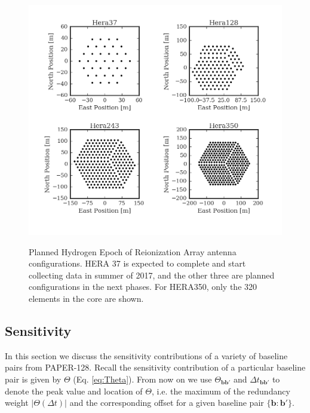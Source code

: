 \documentclass[twocolumn,apj,numberedappendix]{emulateapj}
\renewcommand\[{\begin{equation}}
\renewcommand\]{\end{equation}}
\begin{document}
\begin{figure}[h]
\includegraphics[width=\linewidth]{HeraAntpos}
\label{fig:HeraAntpos}
\caption{Planned Hydrogen Epoch of Reionization Array antenna configurations. HERA 37 is expected to complete and start collecting data in summer of 2017, and the other three are planned configurations in the next phases. For HERA350, only the 320 elements in the core are shown. }
\end{figure}

\subsection{ Sensitivity \label{sec:sensitivity}}
In this section we discuss the sensitivity contributions of a variety of baseline pairs from PAPER-128.
Recall the sensitivity contribution of a particular baseline pair is given by $\Theta$ (Eq. \eqref{eq:Theta}). From now on we use $\Theta_{\boldsymbol{bb'}}$ and $\Delta t_{\boldsymbol{bb'}}$ to denote the peak value and location of $\Theta$, i.e. the maximum of the redundancy weight $|\Theta(\Delta t)|$ and the corresponding offset for a given baseline pair $\{\boldsymbol{b}:\boldsymbol{b'}\}$. 
\end{document}
